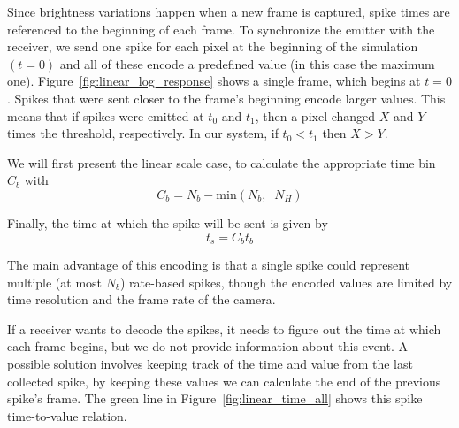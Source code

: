 \documentclass[conference]{IEEEtran}
\begin{document}
Since brightness variations happen when a new frame is captured, spike times are referenced to the beginning of each frame. To synchronize the emitter with the receiver, we send one spike for each pixel at the beginning of the simulation $(t=0)$ and all of these encode a predefined value (in this case the maximum one). Figure~\ref{fig:linear_log_response} shows a single frame, which begins at $t=0$. Spikes that were sent closer to the frame's beginning encode larger values. This means that if spikes were emitted at $t_{0}$ and $t_{1}$,  then a pixel changed $X$ and  $Y$ times the threshold, respectively. In our system, if $t_{0} < t_{1}$ then $X > Y$.

We will first present the linear scale case, to calculate the appropriate time bin $C_{b}$ with
\begin{equation}
\label{eq:linear_bin_calc}
C_{b} = N_{b} - \mathrm{min}\left( N_{b}, \;\; N_{H} \right) 
\end{equation}

Finally, the time at which the spike will be sent is given by
\begin{equation}
t_{s} = C_{b}t_{b}
\end{equation}

The main advantage of this encoding is that a single spike could represent multiple (at most $N_{b}$) rate-based spikes, though the encoded values are limited by time resolution and the frame rate of the camera.

If a receiver wants to decode the spikes, it needs to figure out the time at which each frame begins, but we do not provide information about this event. A possible solution involves keeping track of the time and value from the last collected spike, by keeping these values we can calculate the end of the previous spike's frame. The green line in Figure~\ref{fig:linear_time_all} shows this spike time-to-value relation. 
\end{document}
